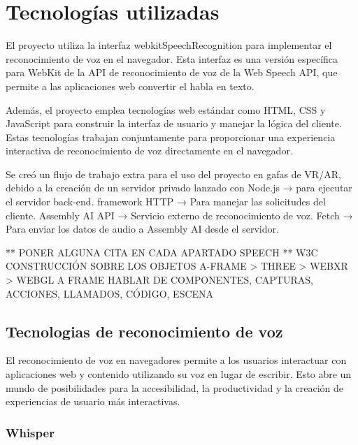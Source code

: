 \documentclass[a4paper, 12pt]{book}
\let\cleardoublepage\clearpage
\begin{document}

\cleardoublepage
\cleardoublepage %

\chapter{Tecnologías utilizadas}
\label{chap:Tecnologías utilizadas}

El proyecto utiliza la interfaz webkitSpeechRecognition para implementar el reconocimiento de voz en el navegador. Esta interfaz es una versión específica para WebKit de la API de reconocimiento de voz de la Web Speech API, que permite a las aplicaciones web convertir el habla en texto.

Además, el proyecto emplea tecnologías web estándar como HTML, CSS y JavaScript para construir la interfaz de usuario y manejar la lógica del cliente. Estas tecnologías trabajan conjuntamente para proporcionar una experiencia interactiva de reconocimiento de voz directamente en el navegador.

Se creó un flujo de trabajo extra para el uso del proyecto en gafas de VR/AR, debido a la creación de un servidor privado lanzado con Node.js → para ejecutar el servidor back-end. framework HTTP → Para manejar las solicitudes del cliente. Assembly AI API → Servicio externo de reconocimiento de voz. Fetch → Para enviar los datos de audio a Assembly AI desde el servidor.

** PONER ALGUNA CITA EN CADA APARTADO
SPEECH 
** W3C
CONSTRUCCIÓN SOBRE LOS OBJETOS
A-FRAME > THREE > WEBXR > WEBGL
A FRAME HABLAR DE COMPONENTES, CAPTURAS, ACCIONES, LLAMADOS, CÓDIGO, ESCENA


\section{Tecnologias de reconocimiento de voz} 
\label{sec:seccion1}

El reconocimiento de voz en navegadores permite a los usuarios interactuar con aplicaciones web y contenido utilizando su voz en lugar de escribir. Esto abre un mundo  de posibilidades para la accesibilidad, la productividad y la creación de experiencias de usuario más interactivas.

\subsection{Whisper}
\end{document}
